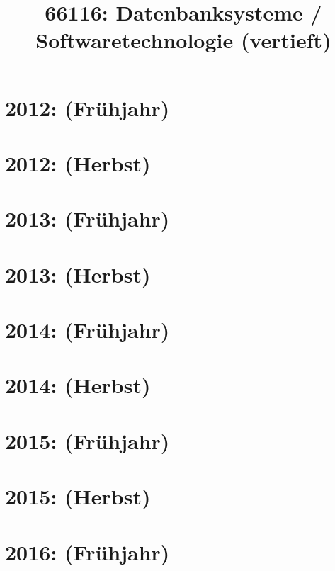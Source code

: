 \documentclass{lehramt-informatik-haupt}
\title{66116: Datenbanksysteme / Softwaretechnologie (vertieft)}
\begin{document}
\maketitle
\tableofcontents

\section{2012: (Frühjahr)}


\section{2012: (Herbst)}


\section{2013: (Frühjahr)}


\section{2013: (Herbst)}


\section{2014: (Frühjahr)}


\section{2014: (Herbst)}


\section{2015: (Frühjahr)}


\section{2015: (Herbst)}


\section{2016: (Frühjahr)}

\end{document}
